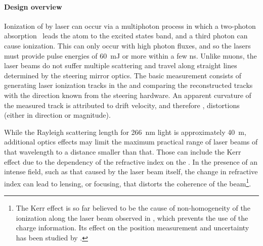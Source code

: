\paragraph{Design overview}
Ionization of  by laser can occur via a multiphoton process in which a two-photon absorption~\cite{Badhrees:2010zz} leads the atom to the excited states band, and a third photon can cause ionization. This can only occur with high photon fluxes, and so the lasers must provide pulse energies of \SI{60}{\milli\joule} or more within a few ns. Unlike muons, the laser beams do not suffer multiple scattering and travel along straight lines determined by the steering mirror optics. 
The basic measurement consists of %
generating laser ionization tracks in the  and comparing the reconstructed tracks with the direction known from the steering hardware. 
An apparent curvature of the measured track is attributed to drift velocity, and therefore \efield, distortions (either in direction or magnitude).



While the Rayleigh scattering length for \SI{266}{\nano\m}  light is approximately \SI{40}{\m}, additional optics effects may limit the maximum practical range of laser beams of that wavelength to a distance smaller than that. Those can include the Kerr effect  due to the dependency of the refractive index on the \efield. In the presence of an intense field, such as that caused by the laser beam itself, the change in refractive index can lead to lensing, or focusing, that distorts the coherence of the beam\footnote{The Kerr effect is so far believed to be the cause of non-homogeneity of the ionization along the laser beam observed in , which prevents the use of the charge information. Its effect on the position measurement and \efield uncertainty has been studied by .}. 


